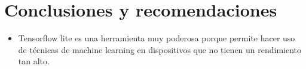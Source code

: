 \section{Conclusiones y recomendaciones}
\begin{itemize}
    \item Tensorflow lite es una herramienta muy poderosa porque permite hacer uso de técnicas de machine learning en dispositivos que no tienen un rendimiento tan alto.
\end{itemize}